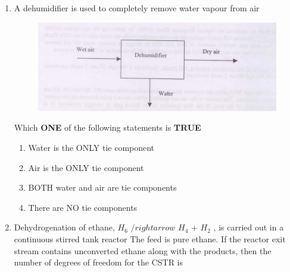 \documentclass[journal,12pt,onecolumn]{IEEEtran}
\theoremstyle{remark}
\begin{document}
\begin{enumerate}
		\hfill {}
		
		\item A dehumidifier  is used to completely remove water vapour from air
		\begin{figure}[H]
			\centering
			\includegraphics[width = 0.7\columnwidth]{q4.png}
			\caption{}
			\label{fig:q4}
		\end{figure}
		Which \textbf{ONE} of the following statements is \textbf{TRUE} 
		\begin{enumerate}
			
			\item  Water is the ONLY tie component
			\item Air is the ONLY tie component
			\item BOTH water and air are tie components
			\item There are NO tie components
			
		\end{enumerate} 
		
		\hfill {}
		
		\item Dehydrogenation of ethane, $ H_6$  $/rightarrow$ $ H_4$  + $H_2$ , is carried out in a continuous stirred tank reactor  The feed is pure ethane. If the reactor exit stream contains unconverted ethane along with the products, then the number of degrees of freedom for the CSTR is 
		\begin{enumerate}
		\end{enumerate} 
		
		\hfill {}
		

\end{enumerate}
\end{document}
